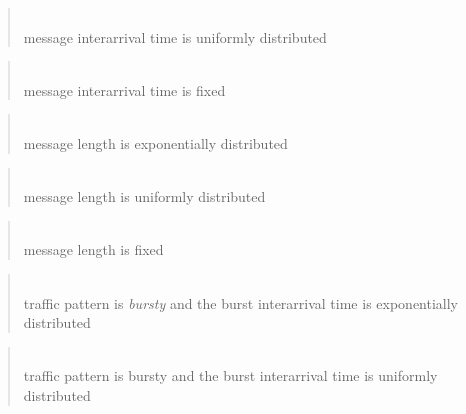 \begin{quote}
\noindent{}\\ \hspace{0in}
message interarrival time is uniformly distributed
\end{quote}

\begin{quote}
\noindent{}\\ \hspace{0in}
message interarrival time is fixed
\end{quote}

\begin{quote}
\noindent{}\\ \hspace{0in}
message length is exponentially distributed
\end{quote}

\begin{quote}
\noindent{}\\ \hspace{0in}
message length is uniformly distributed
\end{quote}

\begin{quote}
\noindent{}\\ \hspace{0in}
message length is fixed
\end{quote}

\begin{quote}
\noindent{}\\ \hspace{0in}
traffic pattern is {\em bursty\/}
and the burst interarrival time is exponentially distributed
\end{quote}

\begin{quote}
\noindent{}\\ \hspace{0in}
traffic pattern is bursty and the burst interarrival time is uniformly
distributed
\end{quote}

